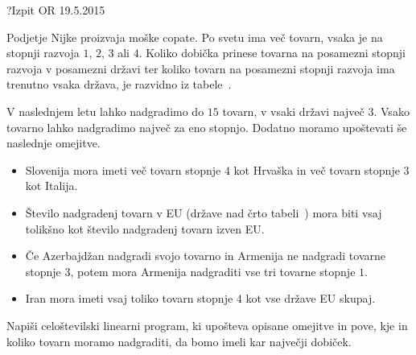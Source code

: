 \begin{naloga}{?}{Izpit OR 19.5.2015}
\begin{vprasanje}
Podjetje Nijke proizvaja moške copate.
Po svetu ima več tovarn,
vsaka je na stopnji razvoja $1$, $2$, $3$ ali $4$.
Koliko dobička prinese
tovarna na posamezni stopnji razvoja v posamezni državi
ter koliko tovarn na posamezni stopnji razvoja ima trenutno vsaka država,
je razvidno iz tabele~\tab{}.

V naslednjem letu lahko nadgradimo do $15$ tovarn,
v vsaki državi največ $3$.
Vsako tovarno lahko nadgradimo največ za eno stopnjo.
Dodatno moramo upoštevati še naslednje omejitve.
\begin{itemize}
\item Slovenija mora imeti več tovarn stopnje $4$ kot Hrvaška
in več tovarn stopnje $3$ kot Italija.
\item Število nadgradenj tovarn v EU (države nad črto tabeli~\tab{})
mora biti vsaj tolikšno kot število nadgradenj tovarn izven EU.
\item Če Azerbajdžan nadgradi svojo tovarno
in Armenija ne nadgradi tovarne stopnje $3$,
potem mora Armenija nadgraditi vse tri tovarne stopnje $1$.
\item Iran mora imeti vsaj toliko tovarn stopnje $4$
kot vse države EU skupaj.
\end{itemize}

Napiši celoštevilski linearni program,
ki upošteva opisane omejitve in pove,
kje in koliko tovarn moramo nadgraditi, da bomo imeli kar največji dobiček.


\end{vprasanje}
\end{naloga}
